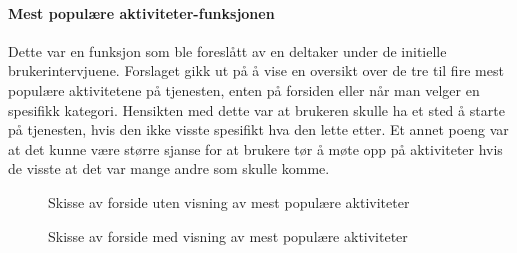 \paragraph{Mest populære aktiviteter-funksjonen}
Dette var en funksjon som ble foreslått av en deltaker under de initielle brukerintervjuene. Forslaget gikk ut på å vise en oversikt over de tre til fire mest populære aktivitetene på tjenesten, enten på forsiden eller når man velger en spesifikk kategori. Hensikten med dette var at brukeren skulle ha et sted å starte på tjenesten, hvis den ikke visste spesifikt hva den lette etter. Et annet poeng var at det kunne være større sjanse for at brukere tør å møte opp på aktiviteter hvis de visste at det var mange andre som skulle komme.

\begin{figure}[H]
\caption{Skisse av forside uten visning av mest populære aktiviteter}
\label{fig:utenMestPopulaere}
\end{figure}

\begin{figure}[H]
\caption{Skisse av forside med visning av mest populære aktiviteter}
\label{fig:medMestPopulaere}
\end{figure}

